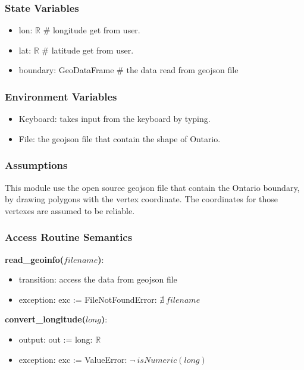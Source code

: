 \documentclass[12pt, titlepage]{article}
\begin{document}
\subsubsection{State Variables}
\begin{itemize}
\item lon: $\mathbb{R}$ \# longitude get from user.
\item lat: $\mathbb{R}$ \# latitude get from user.
\item boundary: GeoDataFrame \# the data read from geojson file
\end{itemize}
\subsubsection{Environment Variables}

\begin{itemize}
\item Keyboard: takes input from the keyboard by typing.
\item File: the geojson file that contain the shape of Ontario.
\end{itemize}

\subsubsection{Assumptions}
This module use the open source geojson file that contain the Ontario boundary, by drawing polygons with the vertex coordinate. The coordinates for those vertexes are assumed to be reliable.

\subsubsection{Access Routine Semantics}

\noindent \textbf{read\_geoinfo($filename$)}:
\begin{itemize}
\item transition: access the data from geojson file
\item exception: exc := FileNotFoundError: $\nexists ~ filename$
\end{itemize}

\noindent \textbf{convert\_longitude($long$)}:
\begin{itemize}
\item output: out := long: $\mathbb{R}$
\item exception: exc := ValueError: $\lnot ~ isNumeric(long)$
\end{itemize}
\end{document}
